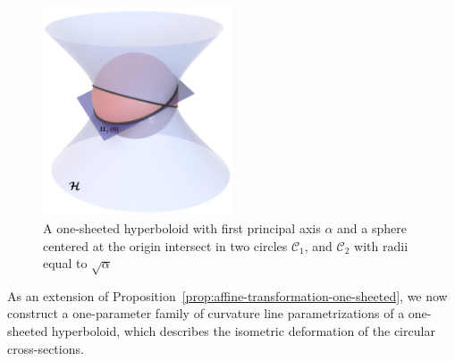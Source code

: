 \documentclass[10pt, a4paper]{article}
\theoremstyle{BoldTopSpacing}
\theoremstyle{BoldTopSpacing}
\theoremstyle{BoldTopSpacing}
\theoremstyle{BoldTopBottomSpacing}
\theoremstyle{BoldTopSpacing}
\theoremstyle{BoldTopBottomSpacing}
\theoremstyle{remark}
\begin{document}
\begin{figure}[H]
    \centering
    \includegraphics[width=0.5\textwidth]{proof-one-sheeted-transformation.png}
\caption[One-sheeted hyperboloid and a sphere centered at the origin intersect in two circles.]{A one-sheeted hyperboloid with first principal axis $\alpha$ and a sphere centered at the origin intersect in two circles $\mathcal{C}_1$, and $\mathcal{C}_2$ with radii equal to $\sqrt{\alpha}$}
    \label{fig:proof-one-sheeted-transformation}
\end{figure}

As an extension of Proposition~\ref{prop:affine-transformation-one-sheeted}, we now construct a one-parameter family of curvature line parametrizations of a one-sheeted hyperboloid, which describes the isometric deformation of the circular cross-sections.
\end{document}
